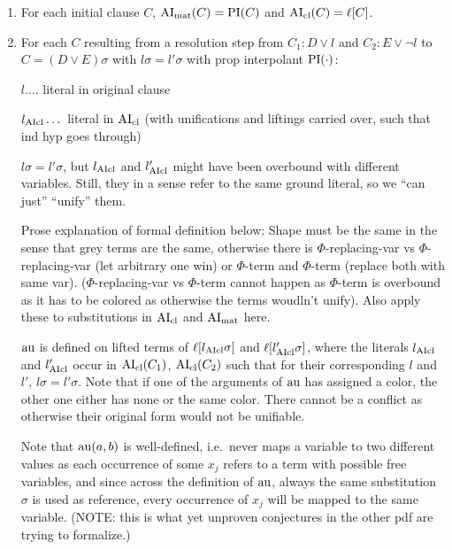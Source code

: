 \documentclass[,%
	paper=a4,%
	DIV12, %
	twoside=false,%
	liststotoc,
	bibtotoc,
	draft=false,%
	numbers=noendperiod
]{scrartcl}
\begin{document}
\begin{enumerate}
	\item 
		For each initial clause $C$, $\operatorname{AI}_\mathrm{mat}(C) = \operatorname{PI}(C)$ and $\operatorname{AI}_\mathrm{cl}(C) = \ell[C]$.

	\item
		For each $C$ resulting from a resolution step from $C_1: D\lor l$ and $C_2: E\lor \lnot l$ to $C = (D \lor E)\sigma$ with $l\sigma = l'\sigma$ with prop interpolant $\operatorname{PI}(\cdot)$:

		$l.\dotsc$ literal in original clause

		$l_{\operatorname{AIcl}}\dotsc$ literal in $\operatorname{AI}_\mathrm{cl}$ (with unifications and liftings carried over, such that ind hyp goes through)


		$l\sigma = l'\sigma$, but $l_{\operatorname{AIcl}}$ and $l_{\operatorname{AIcl}}'$ might have been overbound with different variables. Still, they in a sense refer to the same ground literal, so we ``can just'' ``unify'' them.

		Prose explanation of formal definition below: Shape must be the same in the sense that grey terms are the same, otherwise there is $\Phi$-replacing-var vs $\Phi$-replacing-var (let arbitrary one win) or $\Phi$-term and $\Phi$-term (replace both with same var). 
		($\Phi$-replacing-var vs $\Phi$-term cannot happen as $\Phi$-term is overbound as it has to be colored as otherwise the terms woudln't unify).
		Also apply these to substitutions in $\operatorname{AI}_\mathrm{cl}$ and $\operatorname{AI}_\mathrm{mat}$ here.

		$\operatorname{au}$ is defined on lifted terms of $\ell[l_{\operatorname{AIcl}}\sigma]$ and $\ell[l_{\operatorname{AIcl}}'\sigma]$, where the literals $l_{\operatorname{AIcl}}$ and $l_{\operatorname{AIcl}}'$
		occur in $\operatorname{AI}_\mathrm{cl}(C_1)$, $\operatorname{AI}_\mathrm{cl}(C_2)$ such that for their corresponding $l$ and $l'$, $l\sigma = l'\sigma$.
		Note that if one of the arguments of $\operatorname{au}$ has assigned a color, the other one either has none or the same color.
		There cannot be a conflict as otherwise their original form would not be unifiable.

		Note that $\operatorname{au}(a, b)$ is well-defined, i.e.~never maps a variable to two different values as each occurrence of some $x_j$ refers to a term with possible free variables, and since across the definition of $\operatorname{au}$, always the same substitution $\sigma$ is used as reference, every occurrence of $x_j$ will be mapped to the same variable. (NOTE: this is what yet unproven conjectures in the other pdf are trying to formalize.)



\end{enumerate}
\end{document}
